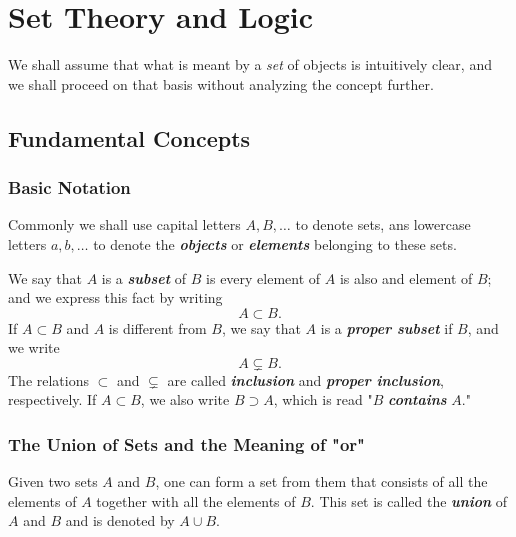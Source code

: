 \documentclass[a4paper,12pt,twoside,openany]{book}
\begin{document}

\restoregeometry
\thispagestyle{empty}
\setcounter{page}{0}
\tableofcontents
\thispagestyle{empty}
\setcounter{page}{0}


\chapter{Set Theory and Logic}

We shall assume that what is meant by a \textit{set} of objects is intuitively clear, and we shall proceed on that basis without analyzing the concept further.

\section{Fundamental Concepts}
\subsection{Basic Notation}

Commonly we shall use capital letters $A,B,\ldots$ to denote sets, ans lowercase letters $a,b,\ldots$ to denote the \textit{\textbf{objects}} or \textit{\textbf{elements}} belonging to these sets.

We say that $A$ is a \textit{\textbf{subset}} of $B$ is every element of $A$ is also and element of $B$; and we express this fact by writing $$A\subset B.$$ If $A\subset B$ and $A$ is different from $B$, we say that $A$ is a \textit{\textbf{proper subset}} if $B$, and we write $$A\subsetneq B.$$ The relations $\subset$ and $\subsetneq$ are called \textit{\textbf{inclusion}} and \textit{\textbf{proper inclusion}}, respectively. If $A\subset B$, we also write $B\supset A$, which is read "$B$ \textit{\textbf{contains}} $A$."

\subsection{The Union of Sets and the Meaning of "or"}

Given two sets $A$ and $B$, one can form a set from them that consists of all the elements of $A$ together with all the elements of $B$. This set is called the \textit{\textbf{union}} of $A$ and $B$ and is denoted by $A\cup B$.
\end{document}
